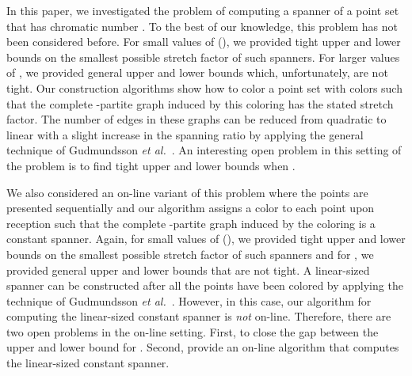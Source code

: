 \documentclass[pdftex,leqno,fleqn,12pts]{llncs}
\begin{document}
In this paper, we investigated the problem of computing a spanner 
of a point set that has chromatic 
number . To the best of our knowledge, this problem has not been 
considered before. For small values of  (), we provided 
tight upper and lower bounds on the smallest possible stretch factor 
of such spanners. For larger values of , we provided general 
upper and lower bounds which, unfortunately, are not tight. Our construction algorithms
show how to color a point set with  colors such that the complete -partite graph
induced by this coloring has the stated stretch factor. The number of edges in these
graphs can be reduced from quadratic to linear with a slight increase in the spanning ratio by applying
the general technique of Gudmundsson  \emph{et al.}~\cite{glns-adogg-02}. An interesting open problem in this setting of the problem is to find tight upper and lower bounds when .

We also considered an on-line variant of this problem where the points
are presented sequentially and our algorithm 
assigns a color to each point upon reception such that the complete -partite graph
induced by the coloring is a constant spanner. Again, for small values of  (), we provided 
tight upper and lower bounds on the smallest possible stretch factor 
of such spanners and for , we provided general 
upper and lower bounds that are not tight.
A linear-sized spanner can be constructed after all the points have been colored by applying the technique of Gudmundsson  \emph{et al.}~\cite{glns-adogg-02}. However, in this case, our algorithm for computing the linear-sized constant spanner is {\em not} on-line.
Therefore, there are two open problems in the on-line setting. First, to close the gap between the upper and lower bound for . Second, provide an on-line algorithm
that computes the linear-sized constant spanner.
 



\end{document}
